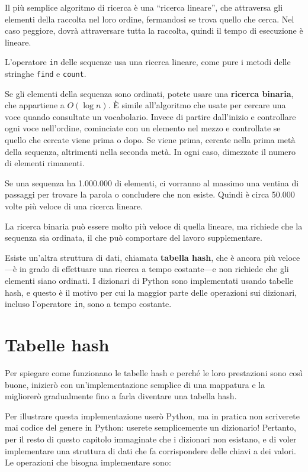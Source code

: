 \documentclass[10pt]{book}
\begin{document}
Il più semplice algoritmo di ricerca è una ``ricerca lineare'', che attraversa gli elementi della raccolta nel loro ordine, fermandosi se trova quello che cerca. Nel caso peggiore, dovrà attraversare tutta la raccolta, quindi il tempo di esecuzione è lineare.

L'operatore {\tt in} delle sequenze usa una ricerca lineare, come pure i metodi delle stringhe {\tt find} e {\tt count}.

Se gli elementi della sequenza sono ordinati, potete usare una {\bf ricerca binaria}, che appartiene a $O(\log n)$.  È simile all'algoritmo che usate per cercare una voce quando consultate un vocabolario. Invece di partire dall'inizio e controllare ogni voce nell'ordine, cominciate con un elemento nel mezzo e controllate se quello che cercate viene prima o dopo. Se viene prima, cercate nella prima metà della sequenza, altrimenti nella seconda metà. In ogni caso, dimezzate il numero di elementi rimanenti.

Se una sequenza ha 1.000.000 di elementi, ci vorranno al massimo una ventina di passaggi per trovare la parola o concludere che non esiste. Quindi è circa 50.000 volte più veloce di una ricerca lineare.

La ricerca binaria può essere molto più veloce di quella lineare, ma richiede che la sequenza sia ordinata, il che può comportare del lavoro supplementare.

Esiste un'altra struttura di dati, chiamata {\bf tabella hash}, che è ancora più veloce---è in grado di effettuare una ricerca a tempo costante---e non richiede che gli elementi siano ordinati. I dizionari di Python sono implementati usando tabelle hash, e questo è il motivo per cui la maggior parte delle operazioni sui dizionari, incluso l'operatore {\tt in}, sono a tempo costante.


\section{Tabelle hash}
\label{hashtable}

Per spiegare come funzionano le tabelle hash e perché le loro prestazioni sono così buone, inizierò con un'implementazione semplice di una mappatura e la migliorerò gradualmente fino a farla diventare una tabella hash.

Per illustrare questa implementazione userò Python, ma in pratica non scriverete mai codice del genere in Python: userete semplicemente un dizionario! Pertanto, per il resto di questo capitolo immaginate che i dizionari non esistano, e di voler implementare una struttura di dati che fa corrispondere delle chiavi a dei valori. Le operazioni che bisogna implementare sono:
\end{document}
